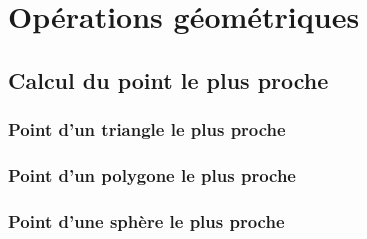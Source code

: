 \appendix

\section{Opérations géométriques}

\subsection{Calcul du point le plus proche}

\subsubsection{Point d'un triangle le plus proche}

\subsubsection{Point d'un polygone le plus proche}

\subsubsection{Point d'une sphère le plus proche}

